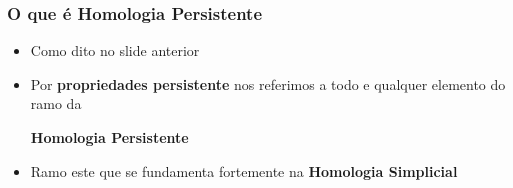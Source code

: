 \documentclass[11pt]{beamer}
\begin{document}
    \begin{frame}
        \frametitle{O que é Homologia Persistente}
        \begin{itemize}
            \item 
                Como dito no slide anterior

            \item 
                Por \textbf{propriedades persistente} nos referimos
                a todo e qualquer elemento do ramo da
                \begin{center}
                    \textbf{Homologia Persistente}
                \end{center}

            \item 
                Ramo este que se fundamenta fortemente na
                \textbf{Homologia Simplicial} \\[1cm]

        \end{itemize}
    \end{frame}
\end{document}
